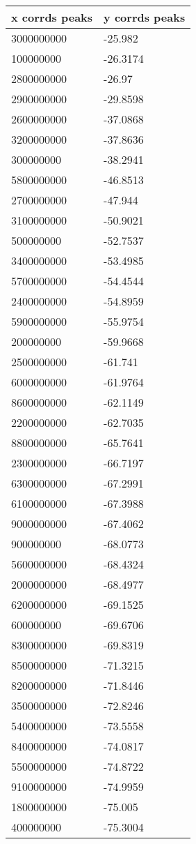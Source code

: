 \begin{tabular}{ll}
x corrds peaks & y corrds peaks \\ 
\hline 
3000000000 & -25.982 \\ 
100000000 & -26.3174 \\ 
2800000000 & -26.97 \\ 
2900000000 & -29.8598 \\ 
2600000000 & -37.0868 \\ 
3200000000 & -37.8636 \\ 
300000000 & -38.2941 \\ 
5800000000 & -46.8513 \\ 
2700000000 & -47.944 \\ 
3100000000 & -50.9021 \\ 
500000000 & -52.7537 \\ 
3400000000 & -53.4985 \\ 
5700000000 & -54.4544 \\ 
2400000000 & -54.8959 \\ 
5900000000 & -55.9754 \\ 
200000000 & -59.9668 \\ 
2500000000 & -61.741 \\ 
6000000000 & -61.9764 \\ 
8600000000 & -62.1149 \\ 
2200000000 & -62.7035 \\ 
8800000000 & -65.7641 \\ 
2300000000 & -66.7197 \\ 
6300000000 & -67.2991 \\ 
6100000000 & -67.3988 \\ 
9000000000 & -67.4062 \\ 
900000000 & -68.0773 \\ 
5600000000 & -68.4324 \\ 
2000000000 & -68.4977 \\ 
6200000000 & -69.1525 \\ 
600000000 & -69.6706 \\ 
8300000000 & -69.8319 \\ 
8500000000 & -71.3215 \\ 
8200000000 & -71.8446 \\ 
3500000000 & -72.8246 \\ 
5400000000 & -73.5558 \\ 
8400000000 & -74.0817 \\ 
5500000000 & -74.8722 \\ 
9100000000 & -74.9959 \\ 
1800000000 & -75.005 \\ 
400000000 & -75.3004 \\ 
\hline 
\end{tabular}